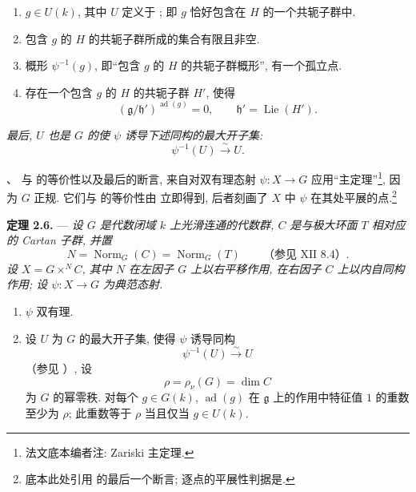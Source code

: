 \begin{enumerate}
\item[(i)] 
  \(g\in U(k)\), 其中 \(U\) 定义于 ; 即 \(g\) 恰好包含在 \(H\) 的一个共轭子群中.
\item[(ii)] 
  包含 \(g\) 的 \(H\) 的共轭子群所成的集合有限且非空.
\item[(iii)] 
  概形 \(\psi^{-1}(g)\), 即“包含 \(g\) 的 \(H\) 的共轭子群概形”, 有一个孤立点.
\item[(iv)] 
  存在一个包含 \(g\) 的 \(H\) 的共轭子群 \(H'\), 使得
  \[
    (\mathfrak g/\mathfrak h')^{\operatorname{ad}(g)}=0,
    \qquad \mathfrak h'=\operatorname{Lie}(H').
  \]
\end{enumerate}

\textit{最后, \(U\) 也是 \(G\) 的使 \(\psi\) 诱导下述同构的最大开子集:}
\[
  \psi^{-1}(U)\xrightarrow{\sim}U.
\]

、 与  的等价性以及最后的断言, 来自对双有理态射 \(\psi:X\to G\) 应用“主定理”\footnote{法文底本编者注: Zariski 主定理.}, 因为 \(G\) 正规. 它们与  的等价性由 立即得到, 后者刻画了 \(X\) 中 \(\psi\) 在其处平展的点.\footnote{底本此处引用  的最后一个断言; 逐点的平展性判据是.}

\medskip
\noindent{}\textbf{定理 2.6.} ---
\textit{设 \(G\) 是代数闭域 \(k\) 上光滑连通的代数群, \(C\) 是与极大环面 \(T\) 相对应的 Cartan 子群, 并置}
\[
  N=\operatorname{Norm}_G(C)=\operatorname{Norm}_G(T)
  \qquad\text{（参见 XII~8.4）.}
\]
\textit{设 \(X=G\times^N C\), 其中 \(N\) 在左因子 \(G\) 上以右平移作用, 在右因子 \(C\) 上以内自同构作用; 设 \(\psi:X\to G\) 为典范态射.}

\begin{enumerate}
\item[\textit{a)}] 
  \(\psi\) 双有理.

\item[\textit{b)}] 
  设 \(U\) 为 \(G\) 的最大开子集, 使得 \(\psi\) 诱导同构
  \[
    \psi^{-1}(U)\xrightarrow{\sim}U
  \]
  （参见 ）, 设
  \[
    \rho=\rho_\nu(G)=\dim C
  \]
  为 \(G\) 的幂零秩. 对每个 \(g\in G(k)\), \(\operatorname{ad}(g)\) 在 \(\mathfrak g\) 上的作用中特征值 \(1\) 的重数至少为 \(\rho\); 此重数等于 \(\rho\) 当且仅当 \(g\in U(k)\).
\end{enumerate}

